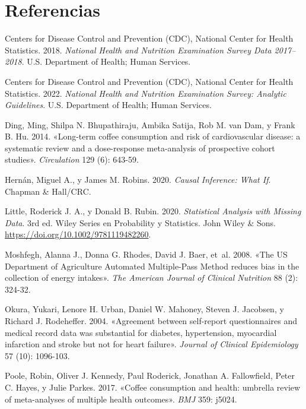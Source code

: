 \documentclass[
  spanish,
  12pt,
]{article}
\newlength{\cslhangindent}
\newenvironment{CSLReferences}[2] %
 {\begin{list}{}{%
  \setlength{\itemindent}{0pt}
  \setlength{\leftmargin}{0pt}
  \setlength{\parsep}{0pt}
  \ifodd #1
   \setlength{\leftmargin}{\cslhangindent}
   \setlength{\itemindent}{-1\cslhangindent}
  \fi
  \setlength{\itemsep}{#2\baselineskip}}}
 {\end{list}}
\begin{document}
\section{Referencias}\label{referencias}

\protect{}\label{refs}
\begin{CSLReferences}{1}{1}
Centers for Disease Control and Prevention (CDC), National Center for Health Statistics. 2018. \emph{National Health and Nutrition Examination Survey Data 2017--2018}. U.S. Department of Health; Human Services.

Centers for Disease Control and Prevention (CDC), National Center for Health Statistics. 2022. \emph{National Health and Nutrition Examination Survey: Analytic Guidelines}. U.S. Department of Health; Human Services.

Ding, Ming, Shilpa N. Bhupathiraju, Ambika Satija, Rob M. van Dam, y Frank B. Hu. 2014. {«Long-term coffee consumption and risk of cardiovascular disease: a systematic review and a dose-response meta-analysis of prospective cohort studies»}. \emph{Circulation} 129 (6): 643-59.

Hernán, Miguel A., y James M. Robins. 2020. \emph{Causal Inference: What If}. Chapman \& Hall/CRC.

Little, Roderick J. A., y Donald B. Rubin. 2020. \emph{Statistical Analysis with Missing Data}. 3rd ed. Wiley Series en Probability y Statistics. John Wiley \& Sons. \url{https://doi.org/10.1002/9781119482260}.

Moshfegh, Alanna J., Donna G. Rhodes, David J. Baer, et~al. 2008. {«The US Department of Agriculture Automated Multiple-Pass Method reduces bias in the collection of energy intakes»}. \emph{The American Journal of Clinical Nutrition} 88 (2): 324-32.

Okura, Yukari, Lenore H. Urban, Daniel W. Mahoney, Steven J. Jacobsen, y Richard J. Rodeheffer. 2004. {«Agreement between self-report questionnaires and medical record data was substantial for diabetes, hypertension, myocardial infarction and stroke but not for heart failure»}. \emph{Journal of Clinical Epidemiology} 57 (10): 1096-103.

Poole, Robin, Oliver J. Kennedy, Paul Roderick, Jonathan A. Fallowfield, Peter C. Hayes, y Julie Parkes. 2017. {«Coffee consumption and health: umbrella review of meta-analyses of multiple health outcomes»}. \emph{BMJ} 359: j5024.


\end{CSLReferences}
\end{document}
